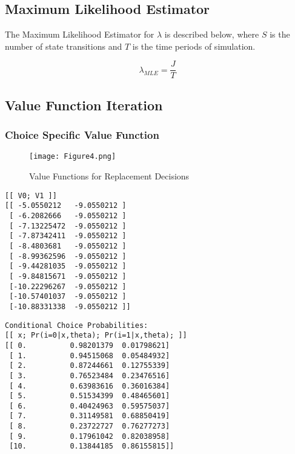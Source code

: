 \documentclass{article}
\begin{document}
\subsection{Maximum Likelihood Estimator}

The Maximum Likelihood Estimator for $\lambda$ is described below, where $S$ is the number of state transitions and $T$ is the time periods of simulation.

$$\lambda_{MLE} = \frac{J}{T}$$

\subsection{Value Function Iteration}

\subsubsection{Choice Specific Value Function}

\begin{figure}[h]
\begin{center}
\texttt{[image: Figure4.png]}
\caption{Value Functions for Replacement Decisions}
\end{center}
\end{figure}
\FloatBarrier

\newpage

\begin{lstlisting}
[[ V0; V1 ]]
[[ -5.0550212   -9.0550212 ]
 [ -6.2082666   -9.0550212 ]
 [ -7.13225472  -9.0550212 ]
 [ -7.87342411  -9.0550212 ]
 [ -8.4803681   -9.0550212 ]
 [ -8.99362596  -9.0550212 ]
 [ -9.44281035  -9.0550212 ]
 [ -9.84815671  -9.0550212 ]
 [-10.22296267  -9.0550212 ]
 [-10.57401037  -9.0550212 ]
 [-10.88331338  -9.0550212 ]]
\end{lstlisting}

\begin{lstlisting}
Conditional Choice Probabilities:
[[ x; Pr(i=0|x,theta); Pr(i=1|x,theta); ]]
[[ 0.          0.98201379  0.01798621]
 [ 1.          0.94515068  0.05484932]
 [ 2.          0.87244661  0.12755339]
 [ 3.          0.76523484  0.23476516]
 [ 4.          0.63983616  0.36016384]
 [ 5.          0.51534399  0.48465601]
 [ 6.          0.40424963  0.59575037]
 [ 7.          0.31149581  0.68850419]
 [ 8.          0.23722727  0.76277273]
 [ 9.          0.17961042  0.82038958]
 [10.          0.13844185  0.86155815]]
\end{lstlisting}
\end{document}

